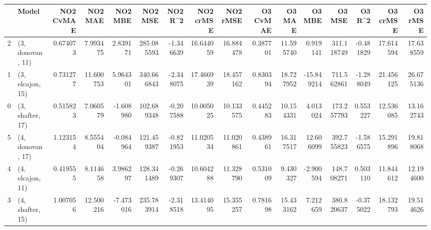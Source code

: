 \begin{tabular}{llrrrrrrrrrrrrrr}
\toprule
{} &             Model &  NO2 CvMAE &    NO2 MAE &   NO2 MBE &     NO2 MSE &   NO2 R\textasciicircum2 &  NO2 crMSE &   NO2 rMSE &  O3 CvMAE &     O3 MAE &     O3 MBE &      O3 MSE &    O3 R\textasciicircum2 &   O3 crMSE &    O3 rMSE \\
\midrule
2 &  (3, donovan, 11) &   0.674073 &   7.993475 &  2.839171 &  285.085593 & -1.346639 &  16.644059 &  16.884478 &  0.387701 &  11.595740 &   0.919141 &  311.118749 & -0.481829 &  17.614594 &  17.638559 \\
1 &  (3, elcajon, 15) &   0.731277 &  11.600753 &  5.964301 &  340.666843 & -2.348075 &  17.466939 &  18.457162 &  0.830394 &  18.727952 & -15.849214 &  711.562861 & -1.288049 &  21.456125 &  26.675136 \\
0 &  (3, shafter, 17) &   0.515823 &   7.060579 & -1.608980 &  102.689348 & -0.207588 &  10.005025 &  10.133575 &  0.445283 &  10.154331 &   4.013024 &  173.257793 &  0.553227 &  12.536085 &  13.162743 \\
5 &  (4, donovan, 17) &   1.123154 &   8.555404 & -0.084964 &  121.459387 & -0.821953 &  11.020534 &  11.020861 &  0.438961 &  16.317517 &  12.606099 &  392.755823 & -1.586575 &  15.291896 &  19.818068 \\
4 &  (4, elcajon, 11) &   0.419555 &   8.114658 &  3.986297 &  128.341489 & -0.269307 &  10.604288 &  11.328790 &  0.531009 &   9.430327 &  -2.900594 &  148.708271 &  0.503110 &  11.844612 &  12.194600 \\
3 &  (4, shafter, 15) &   1.007056 &  12.500216 & -7.473016 &  235.783914 & -2.318518 &  13.414095 &  15.355257 &  0.781698 &  15.433162 &   7.212659 &  380.820637 & -0.375022 &  18.132793 &  19.514626 \\
\bottomrule
\end{tabular}

